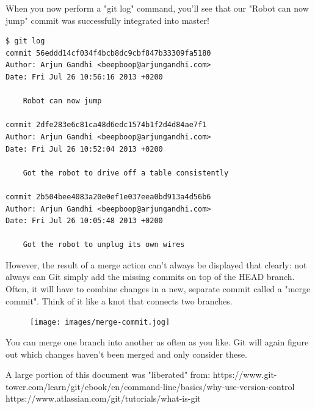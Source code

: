 \documentclass{article}
\begin{document}
When you now perform a "git log" command, you'll see that our "Robot can now jump" commit was successfully integrated into master!

\begin{lstlisting}
$ git log
commit 56eddd14cf034f4bcb8dc9cbf847b33309fa5180
Author: Arjun Gandhi <beepboop@arjungandhi.com>
Date: Fri Jul 26 10:56:16 2013 +0200

    Robot can now jump

commit 2dfe283e6c81ca48d6edc1574b1f2d4d84ae7f1
Author: Arjun Gandhi <beepboop@arjungandhi.com>
Date: Fri Jul 26 10:52:04 2013 +0200

    Got the robot to drive off a table consistently

commit 2b504bee4083a20e0ef1e037eea0bd913a4d56b6
Author: Arjun Gandhi <beepboop@arjungandhi.com>
Date: Fri Jul 26 10:05:48 2013 +0200

    Got the robot to unplug its own wires
\end{lstlisting}

However, the result of a merge action can't always be displayed that clearly: not always can Git simply add the missing commits on top of the HEAD branch. Often, it will have to combine changes in a new, separate commit called a "merge commit". Think of it like a knot that connects two branches.
\begin{figure}[h]
    \centering
    \texttt{[image: images/merge-commit.jog]}
\end{figure}

You can merge one branch into another as often as you like. Git will again figure out which changes haven't been merged and only consider these.

\begin{thebibliography}{9}
A large portion of this document was "liberated" from:
https://www.git-tower.com/learn/git/ebook/en/command-line/basics/why-use-version-control
https://www.atlassian.com/git/tutorials/what-is-git
\end{thebibliography}
\end{document}
